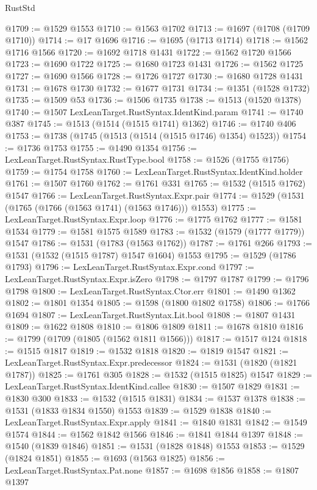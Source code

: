 \begin{lexlean}{RustStd}
\begin{coremodule}
@1709 := @1529 @1553
@1710 := @1563 @1702
@1713 := @1697 (@1708 (@1709 @1710))
@1714 := @17 @1696
@1716 := @1695 (@1713 @1714)
@1718 := @1562 @1716 @1566
@1720 := @1692 @1718 @1431
@1722 := @1562 @1720 @1566
@1723 := @1690 @1722
@1725 := @1680 @1723 @1431
@1726 := @1562 @1725
@1727 := @1690 @1566
@1728 := @1726 @1727
@1730 := @1680 @1728 @1431
@1731 := @1678 @1730
@1732 := @1677 @1731
@1734 := @1351 (@1528 @1732)
@1735 := @1509 @53
@1736 := @1506 @1735
@1738 := @1513 (@1520 @1378)
@1740 := @1507 LexLeanTarget.RustSyntax.IdentKind.param
@1741 := @1740 @387
@1745 := @1513 (@1514 (@1515 @1741) @1362)
@1746 := @1740 @406
@1753 := @1738 (@1745 (@1513 (@1514 (@1515 @1746) @1354) @1523))
@1754 := @1736 @1753
@1755 := @1490 @1354
@1756 := LexLeanTarget.RustSyntax.RustType.bool
@1758 := @1526 (@1755 @1756)
@1759 := @1754 @1758
@1760 := LexLeanTarget.RustSyntax.IdentKind.holder
@1761 := @1507 @1760
@1762 := @1761 @331
@1765 := @1532 (@1515 @1762) @1547
@1766 := LexLeanTarget.RustSyntax.Expr.pair
@1774 := @1529 (@1531 (@1765 (@1766 (@1563 @1741) (@1563 @1746))) @1553)
@1775 := LexLeanTarget.RustSyntax.Expr.loop
@1776 := @1775 @1762
@1777 := @1581 @1534
@1779 := @1581 @1575 @1589
@1783 := @1532 (@1579 (@1777 @1779)) @1547
@1786 := @1531 (@1783 (@1563 @1762))
@1787 := @1761 @266
@1793 := @1531 (@1532 (@1515 @1787) @1547 @1604) @1553
@1795 := @1529 (@1786 @1793)
@1796 := LexLeanTarget.RustSyntax.Expr.cond
@1797 := LexLeanTarget.RustSyntax.Expr.isZero
@1798 := @1797 @1787
@1799 := @1796 @1798
@1800 := LexLeanTarget.RustSyntax.Ctor.err
@1801 := @1490 @1362
@1802 := @1801 @1354
@1805 := @1598 (@1800 @1802 @1758)
@1806 := @1766 @1694
@1807 := LexLeanTarget.RustSyntax.Lit.bool
@1808 := @1807 @1431
@1809 := @1622 @1808
@1810 := @1806 @1809
@1811 := @1678 @1810
@1816 := @1799 (@1709 (@1805 (@1562 @1811 @1566)))
@1817 := @1517 @124
@1818 := @1515 @1817
@1819 := @1532 @1818
@1820 := @1819 @1547
@1821 := LexLeanTarget.RustSyntax.Expr.predecessor
@1824 := @1531 (@1820 (@1821 @1787))
@1825 := @1761 @305
@1828 := @1532 (@1515 @1825) @1547
@1829 := LexLeanTarget.RustSyntax.IdentKind.callee
@1830 := @1507 @1829
@1831 := @1830 @300
@1833 := @1532 (@1515 @1831)
@1834 := @1537 @1378
@1838 := @1531 (@1833 @1834 @1550) @1553
@1839 := @1529 @1838
@1840 := LexLeanTarget.RustSyntax.Expr.apply
@1841 := @1840 @1831
@1842 := @1549 @1574
@1844 := @1562 @1842 @1566
@1846 := @1841 @1844 @1397
@1848 := @1540 (@1839 @1846)
@1851 := @1531 (@1828 @1848) @1553
@1853 := @1529 (@1824 @1851)
@1855 := @1693 (@1563 @1825)
@1856 := LexLeanTarget.RustSyntax.Pat.none
@1857 := @1698 @1856
@1858 := @1807 @1397

\end{coremodule}
\end{lexlean}
